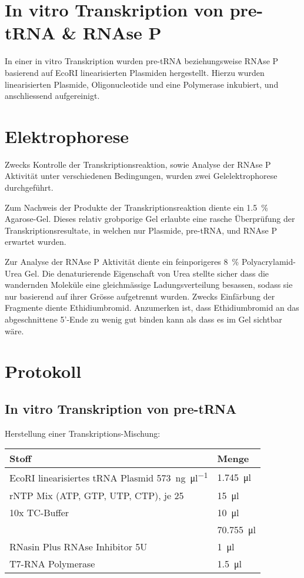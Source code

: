 \documentclass[a4paper,english]{scrreprt}
\begin{document}
\section{In vitro Transkription von pre-tRNA \& RNAse P}

In einer in vitro Transkription wurden pre-tRNA beziehungsweise RNAse P
basierend auf EcoRI linearisierten Plasmiden hergestellt. Hierzu wurden
linearisierten Plasmide, Oligonucleotide und eine Polymerase inkubiert, und
anschliessend aufgereinigt.

\section{Elektrophorese}

Zwecks Kontrolle der Transkriptionsreaktion, sowie Analyse der RNAse P
Aktivität unter verschiedenen Bedingungen, wurden zwei Gelelektrophorese
durchgeführt.

Zum Nachweis der Produkte der Transkriptionsreaktion diente ein
\SI{1.5}{\percent} Agarose-Gel. Dieses relativ grobporige Gel erlaubte eine
rasche Überprüfung der Transkriptionsresultate, in welchen nur Plasmide,
pre-tRNA, und RNAse P erwartet wurden.

Zur Analyse der RNAse P Aktivität diente ein feinporigeres \SI{8}{\percent}
Polyacrylamid-Urea Gel. Die denaturierende Eigenschaft von Urea stellte sicher
dass die wandernden Moleküle eine gleichmässige Ladungsverteilung besassen,
sodass sie nur basierend auf ihrer Grösse aufgetrennt wurden. Zwecks Einfärbung
der Fragmente diente Ethidiumbromid. Anzumerken ist, dass Ethidiumbromid an
das abgeschnittene 5'-Ende zu wenig gut binden kann als dass es im Gel sichtbar
wäre.

\section{Protokoll\cite{skriptv1}}

\subsection{In vitro Transkription von pre-tRNA}

Herstellung einer Transkriptions-Mischung:
\\

\begin{tabu}{ll}
	\toprule
	Stoff & Menge \\
	\midrule
	EcoRI linearisiertes tRNA Plasmid \SI{573}{\ng \per \ul} & \SI{1.745}{\ul} \\
	rNTP Mix (ATP, GTP, UTP, CTP), je \SI{25}{\milli\Molar} & \SI{15}{\ul} \\
	10x TC-Buffer & \SI{10}{\ul} \\
	 & \SI{70.755}{\ul} \\
	RNasin Plus RNAse Inhibitor 5U & \SI{1}{\ul} \\
	T7-RNA Polymerase & \SI{1.5}{\ul} \\
	\bottomrule
\end{tabu}
\\
\end{document}
